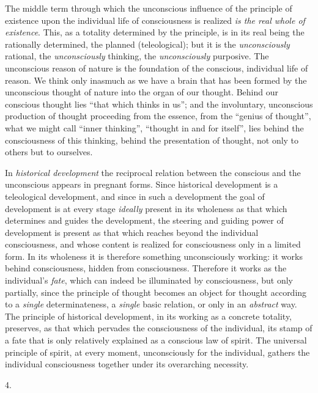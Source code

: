 \documentclass[12pt,a4paper,openany]{book}
\newcommand{\secnum}[1]{\par\begin{center}#1\end{center}\par\nobreak}
\newcommand{\opage}[1]{\marginnote{\footnotesize\textit{[#1]}}}
\begin{document}
The middle term through which the unconscious influence of the
principle of existence upon the individual life of consciousness is
realized \emph{is the real whole of existence}. This, as a totality
determined by the principle, is in its real being the rationally
determined, the planned (teleological); but it is the
\emph{unconsciously} rational, the \emph{unconsciously} thinking, the
\emph{unconsciously} purposive. The unconscious reason of nature is the
foundation of the conscious, individual life of reason. We think only
inasmuch as we have a brain that has been formed by the unconscious
thought of nature into
\opage{55}the organ of our thought. Behind our conscious thought lies
``that which thinks in us''; and the involuntary, unconscious
production of thought proceeding from the essence, from the ``genius of
thought'', what we might call ``inner thinking'', ``thought in and for
itself'', lies behind the consciousness of this thinking, behind the
presentation of thought, not only to others but to ourselves.

In \emph{historical development} the reciprocal relation between the
conscious and the unconscious appears in pregnant forms. Since
historical development is a teleological development, and since in
such a development the goal of development is at every stage
\emph{ideally} present in its wholeness as that which determines and
guides the development, the steering and guiding power of development
is present as that which reaches beyond the individual consciousness,
and whose content is realized for consciousness only in a limited
form. In its wholeness it is therefore something unconsciously
working: it works behind consciousness, hidden from consciousness.
Therefore it works as the individual's \emph{fate}, which can indeed
be illuminated by consciousness, but only partially, since the
principle of thought becomes an object for thought according to a
\emph{single} determinateness, a \emph{single} basic relation, or only
in an \emph{abstract} way. The principle of historical development, in
its working as a concrete totality, preserves, as that which pervades
the consciousness of the individual, its stamp of a fate that is only
relatively explained as a conscious law of spirit. The universal
principle of spirit, at every moment, unconsciously for the
individual, gathers the individual consciousness together under its
overarching necessity.

\secnum{4.}
\end{document}

